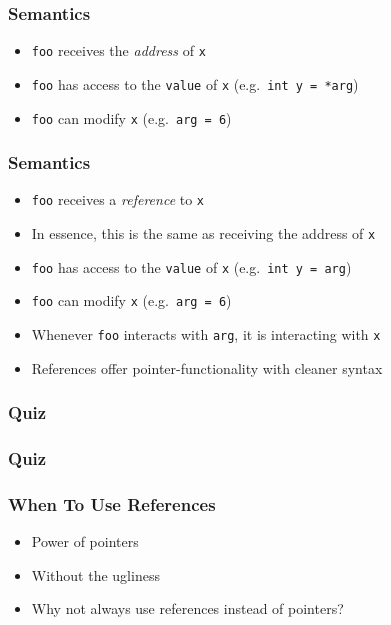 \documentclass{../ucll-slides}
\begin{document}
\begin{frame}
  \frametitle{Semantics}
  \begin{itemize}
    \item {\tt foo} receives the \emph{address} of {\tt x}
    \item {\tt foo} has access to the {\tt value} of {\tt x} (e.g.\ {\tt int y = *arg})
    \item {\tt foo} can modify {\tt x} (e.g.\ {\tt *arg = 6})
  \end{itemize}
\end{frame}

\begin{frame}
  \frametitle{Semantics}
  \begin{itemize}
    \item {\tt foo} receives a \emph{reference} to {\tt x}
    \item In essence, this is the same as receiving the address of {\tt x}
    \item {\tt foo} has access to the {\tt value} of {\tt x} (e.g.\ {\tt int y = arg})
    \item {\tt foo} can modify {\tt x} (e.g.\ {\tt arg = 6})
    \item Whenever {\tt foo} interacts with {\tt arg}, it is interacting with {\tt x}
    \item References offer pointer-functionality with cleaner syntax
  \end{itemize}
\end{frame}

\begin{frame}
  \frametitle{Quiz}
\end{frame}

\begin{frame}
  \frametitle{Quiz}
\end{frame}

\begin{frame}
  \frametitle{When To Use References}
  \begin{itemize}
    \item Power of pointers
    \item Without the ugliness
    \item Why not always use references instead of pointers?
  \end{itemize}
\end{frame}
\end{document}
